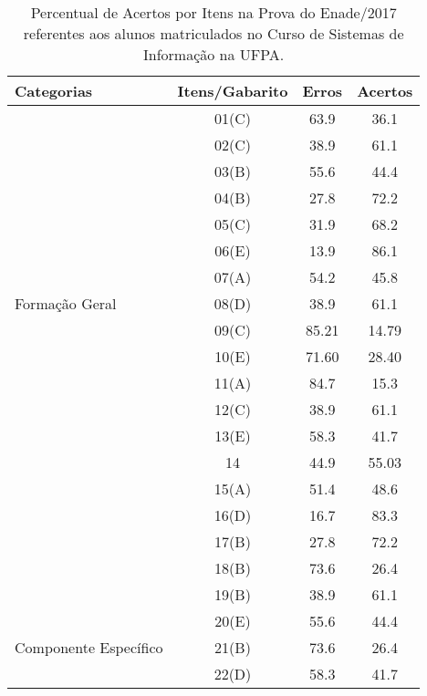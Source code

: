 \documentclass[12pt]{article}
\begin{document}
\begin{table}[!h]
\centering
	\caption{Percentual de Acertos por Itens na Prova do Enade/2017 referentes aos alunos matriculados no Curso de Sistemas de Informação na UFPA.}
\begin{tabular}{l|c|c|c}
\hline\hline 
Categorias   & Itens/Gabarito   & Erros  & Acertos  \\
\hline\hline
               & 01(C)     & 63.9         & 36.1         \\
               & 02(C)      & 38.9         & 61.1         \\
               & 03(B)      & 55.6         & 44.4          \\
               & 04(B)      & 27.8         & 72.2         \\
               & 05(C)      & 31.9         & 68.2          \\
               & 06(E)      & 13.9         & 86.1          \\
               & 07(A)      & 54.2        & 45.8         \\
Formação Geral & 08(D)      & 38.9         & 61.1          \\
               & 09(C)      & 85.21       & 14.79         \\
               & 10(E)      & 71.60        & 28.40          \\
               & 11(A)      &  84.7        & 15.3           \\
               & 12(C)      &  38.9        & 61.1            \\
               & 13(E)      &  58.3        & 41.7           \\
               & 14         &  44.9        & 55.03          \\
               & 15(A)      &  51.4        & 48.6           \\
               & 16(D)      &  16.7        &  83.3          \\
               & 17(B)      &  27.8         & 72.2           \\
               & 18(B)      &  73.6         & 26.4              \\
               & 19(B)      &  38.9         & 61.1             \\
               & 20(E)      &  55.6         &  44.4             \\
Componente Específico    
               & 21(B)      &  73.6         &  26.4             \\
               & 22(D)      &  58.3         &  41.7            \\

\end{tabular}
\end{table}
\end{document}
